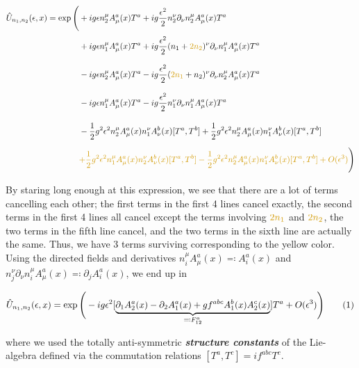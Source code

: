 \documentclass{article}
\newcommand\numberthis{\addtocounter{equation}{1}\tag{\theequation}}
\theoremstyle{plain} %
\theoremstyle{convention} %
\theoremstyle{remark} %
\def\df#1{\textbf{\textit{#1}}}
\numberwithin{equation}{section}
\begin{document}
\begin{align*}
    \hat{U}_{n_1,n_2}(\epsilon,x) = \exp \Bigg( &+ig \epsilon n_2^{\mu} A_{\mu}^a(x) T^a + ig \frac{\epsilon^2}{2} n_2^{\nu} \partial_{\nu} n_2^{\mu} A_{\mu}^a(x) T^a \Bigg. \\
    \Bigg. &+ig \epsilon n_1^{\mu} A_{\mu}^a(x) T^a + ig \frac{\epsilon^2}{2} (n_1+\textcolor{cyellow}{2 n_2})^{\nu} \partial_{\nu} n_1^{\mu} A_{\mu}^a(x) T^a \Bigg. \\
    \Bigg. &-ig \epsilon n_2^{\mu} A_{\mu}^a(x) T^a - ig \frac{\epsilon^2}{2} (\textcolor{cyellow}{2 n_1}+n_2)^{\nu} \partial_{\nu} n_2^{\mu} A_{\mu}^a(x) T^a \Bigg. \\
    \Bigg. &-ig \epsilon n_1^{\mu} A_{\mu}^a(x) T^a - ig \frac{\epsilon^2}{2} n_1^{\nu} \partial_{\nu} n_1^{\mu} A_{\mu}^a(x) T^a \Bigg. \\
    \Bigg. &-\frac{1}{2} g^2 \epsilon^2 n_2^{\mu} A_{\mu}^a(x) n_1^{\nu} A_{\nu}^b(x) [T^a,T^b] +\frac{1}{2} g^2 \epsilon^2 n_2^{\mu} A_{\mu}^a(x) n_1^{\nu} A_{\nu}^b(x) [T^a,T^b] \Bigg. \\
    \Bigg. &\textcolor{cyellow}{+\frac{1}{2} g^2 \epsilon^2 n_1^{\mu} A_{\mu}^a(x) n_2^{\nu} A_{\nu}^b(x) [T^a,T^b] -\frac{1}{2} g^2 \epsilon^2 n_2^{\mu} A_{\mu}^a(x) n_1^{\nu} A_{\nu}^b(x) [T^a,T^b] + O(\epsilon^3)} \Bigg)
\end{align*}

By staring long enough at this expression, we see that there are a lot of terms cancelling each other; the first terms in the first \num{4} lines cancel exactly, the second terms in the first \num{4} lines all cancel except the terms involving $\textcolor{cyellow}{2 n_1}$ and $\textcolor{cyellow}{2 n_2}$, the two terms in the fifth line cancel, and the two terms in the sixth line are actually the same. Thus, we have \num{3} terms surviving corresponding to the \textcolor{cyellow}{yellow} color. Using the directed fields and derivatives $n_i^{\mu} A_{\mu}^a(x) \eqqcolon A_i^a(x)$ and $n_j^{\nu} \partial_{\nu} n_i^{\mu} A_{\mu}^a(x) \eqqcolon \partial_j A_i^a(x)$, we end up in

\begin{align*}
    \hat{U}_{n_1,n_2}(\epsilon,x) = \exp \Bigg( -ig \epsilon^2 [ \underbrace{\partial_1 A_2^a(x) - \partial_2 A_1^a(x) + g f^{abc} A_1^b(x) A_2^c(x)}_{\eqqcolon F_{12}^a} ] T^a + O(\epsilon^3) \Bigg) \numberthis \label{eq:plaq_exp}
\end{align*}

where we used the totally anti-symmetric \df{structure constants} of the Lie-algebra defined via the commutation relations $[T^a,T^c] = i f^{abc}T^c$.
\end{document}
